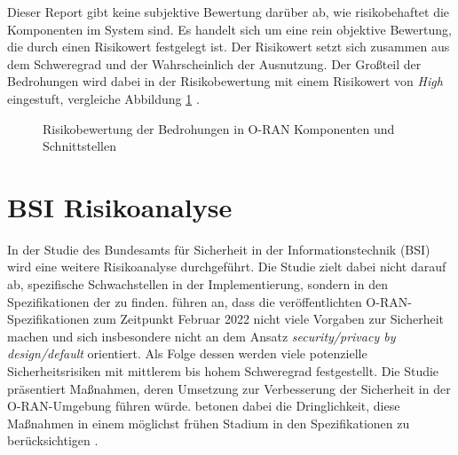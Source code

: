 \par Dieser Report gibt keine subjektive Bewertung darüber ab, wie risikobehaftet die Komponenten im System sind. Es handelt sich um eine rein objektive Bewertung, die durch einen Risikowert festgelegt ist. Der Risikowert setzt sich zusammen aus dem Schweregrad und der Wahrscheinlich der Ausnutzung. Der Großteil der Bedrohungen wird dabei in der Risikobewertung mit einem Risikowert von \textit{High} eingestuft, vergleiche Abbildung \ref{fig:riskscore-oran-components} \autocite{o-ranworkgroup11securityworkgroupORANSecurityThreat2024}.
%
\begin{figure}
    \centering
    \label{fig:riskscore-oran-components}
    \caption{Risikobewertung der Bedrohungen in O-RAN Komponenten und Schnittstellen}
\end{figure}
%

\section{BSI Risikoanalyse}
\label{sec:forschungsstand-bsi}
In der Studie des Bundesamts für Sicherheit in der Informationstechnik (BSI) wird eine weitere Risikoanalyse durchgeführt. Die Studie zielt dabei nicht darauf ab, spezifische Schwachstellen in der Implementierung, sondern in den Spezifikationen der \orana{} zu finden. \citeauthor{kopsellOpenRANRisikoanalyse2022} führen an, dass die veröffentlichten O-RAN-Spezifikationen zum Zeitpunkt Februar 2022 nicht viele Vorgaben zur Sicherheit machen und sich insbesondere nicht an dem Ansatz \textit{security/privacy by design/default} orientiert. Als Folge dessen werden viele potenzielle Sicherheitsrisiken mit mittlerem bis hohem Schweregrad festgestellt. Die Studie präsentiert Maßnahmen, deren Umsetzung zur Verbesserung der Sicherheit in der O-RAN-Umgebung führen würde. \citeauthor{kopsellOpenRANRisikoanalyse2022} betonen dabei die Dringlichkeit, diese Maßnahmen in einem möglichst frühen Stadium in den Spezifikationen zu berücksichtigen \autocite{kopsellOpenRANRisikoanalyse2022}.
%
